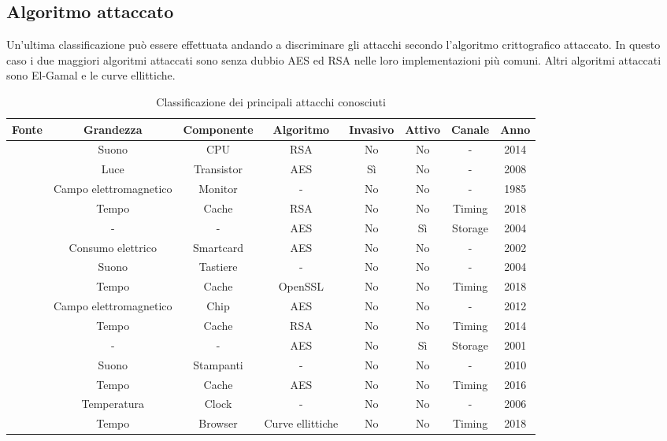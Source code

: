 		\subsection*{Algoritmo attaccato}		
			Un'ultima classificazione può essere effettuata andando a discriminare gli attacchi secondo l'algoritmo crittografico attaccato. In questo caso i due maggiori algoritmi attaccati sono senza dubbio \ac{AES}\cite{standard2001announcing} ed RSA\cite{rivest1978method} nelle loro implementazioni più comuni. Altri algoritmi attaccati sono El-Gamal\cite{elgamal1985public} e le curve ellittiche\cite{koblitz1987elliptic,miller1985use}.
			\begin{table}[]
				\scriptsize
				\centering
				\begin{tabular}{|c|c|c|c|c|c|c|c|} \hline
					Fonte						& Grandezza					& Componente	& Algoritmo			& Invasivo	& Attivo	& Canale	& Anno	\\ \hline \hline
					\cite{genkin2014rsa}		& Suono						& CPU			& RSA				& No		& No		& -			& 2014	\\ \hline
					\cite{ferrigno2008aes}		& Luce						& Transistor	& AES				& Sì		& No		& -			& 2008	\\ \hline
					\cite{van1985electromagn}	& Campo elettromagnetico	& Monitor    	& -					& No		& No		& -			& 1985	\\ \hline
					\cite{kocher2018spectre}	& Tempo						& Cache			& RSA				& No		& No		& Timing	& 2018	\\ \hline
					\cite{giraud2004dfa}		& -							& -				& AES				& No		& Sì		& Storage	& 2004	\\ \hline
					\cite{mangard2002simple}	& Consumo elettrico			& Smartcard		& AES				& No		& No		& -			& 2002	\\ \hline
					\cite{asonov2004keyboard}	& Suono						& Tastiere		& -					& No		& No		& -			& 2004	\\ \hline
					\cite{zhou2018efficient}	& Tempo						& Cache			& OpenSSL			& No		& No		& Timing	& 2018	\\ \hline
					\cite{martinasek2012simple}	& Campo elettromagnetico	& Chip			& AES				& No		& No		& -			& 2012	\\ \hline
					\cite{yarom2014flush+}		& Tempo						& Cache			& RSA				& No		& No		& Timing	& 2014	\\ \hline
					\cite{karri2001fault}		& -							& -				& AES				& No		& Sì		& Storage	& 2001	\\ \hline
					\cite{backes2010acoustic}	& Suono						& Stampanti		& -					& No		& No		& -			& 2010	\\ \hline
					\cite{lipp2016armageddon}	& Tempo						& Cache			& AES				& No		& No		& Timing	& 2016	\\ \hline
					\cite{murdoch2006hot}		& Temperatura				& Clock			& -					& No		& No		& -			& 2006	\\ \hline
					\cite{genkin2018drive}		& Tempo						& Browser		& Curve ellittiche	& No		& No		& Timing	& 2018	\\ \hline
				\end{tabular}
				\caption{Classificazione dei principali attacchi conosciuti}
				\label{tab:attacchi}
			\end{table}
